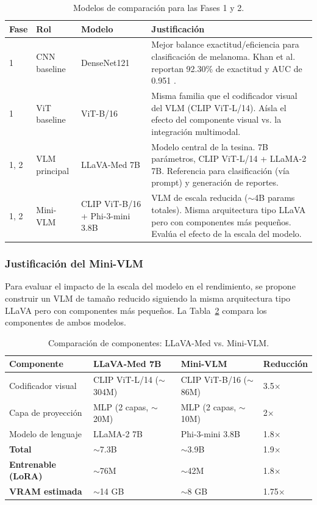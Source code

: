 \documentclass[11pt, a4paper]{article}
\begin{document}
\begin{table}[H]
\centering
\caption{Modelos de comparación para las Fases 1 y 2.}
\label{tab:baselines}
\small
\begin{tabular}{@{}lllp{6.5cm}@{}}
\toprule
\textbf{Fase} & \textbf{Rol} & \textbf{Modelo} & \textbf{Justificación} \\
\midrule
1 & CNN baseline & DenseNet121 & Mejor balance exactitud/eficiencia para clasificación de melanoma. Khan et al. reportan 92.30\% de exactitud y AUC de 0.951 \cite{khan_ensemble_2025}. \\
1 & ViT baseline & ViT-B/16 & Misma familia que el codificador visual del VLM (CLIP ViT-L/14). Aísla el efecto del componente visual vs. la integración multimodal. \\
1, 2 & VLM principal & LLaVA-Med 7B & Modelo central de la tesina. 7B parámetros, CLIP ViT-L/14 + LLaMA-2 7B. Referencia para clasificación (vía prompt) y generación de reportes. \\
1, 2 & Mini-VLM & CLIP ViT-B/16 + Phi-3-mini 3.8B & VLM de escala reducida ($\sim$4B params totales). Misma arquitectura tipo LLaVA pero con componentes más pequeños. Evalúa el efecto de la escala del modelo. \\
\bottomrule
\end{tabular}
\end{table}

\subsubsection{Justificación del Mini-VLM}

Para evaluar el impacto de la escala del modelo en el rendimiento, se propone construir un VLM de tamaño reducido siguiendo la misma arquitectura tipo LLaVA pero con componentes más pequeños. La Tabla~\ref{tab:mini_vlm} compara los componentes de ambos modelos.

\begin{table}[H]
\centering
\caption{Comparación de componentes: LLaVA-Med vs. Mini-VLM.}
\label{tab:mini_vlm}
\small
\begin{tabular}{@{}llll@{}}
\toprule
\textbf{Componente} & \textbf{LLaVA-Med 7B} & \textbf{Mini-VLM} & \textbf{Reducción} \\
\midrule
Codificador visual & CLIP ViT-L/14 ($\sim$304M) & CLIP ViT-B/16 ($\sim$86M) & 3.5$\times$ \\
Capa de proyección & MLP (2 capas, $\sim$20M) & MLP (2 capas, $\sim$10M) & 2$\times$ \\
Modelo de lenguaje & LLaMA-2 7B & Phi-3-mini 3.8B & 1.8$\times$ \\
\midrule
\textbf{Total} & $\sim$7.3B & $\sim$3.9B & 1.9$\times$ \\
\textbf{Entrenable (LoRA)} & $\sim$76M & $\sim$42M & 1.8$\times$ \\
\textbf{VRAM estimada} & $\sim$14 GB & $\sim$8 GB & 1.75$\times$ \\
\bottomrule
\end{tabular}
\end{table}
\end{document}
